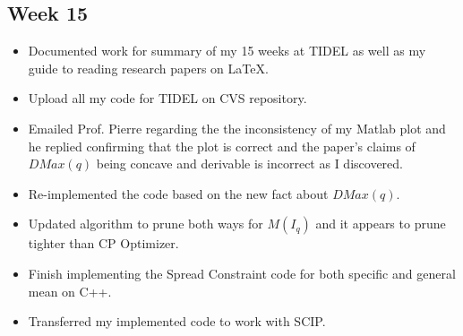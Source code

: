 \documentclass[a4paper,12pt]{article}
\begin{document}
\subsection{Week 15}
	\begin{itemize}
		\item Documented work for summary of my 15 weeks at TIDEL as well as my guide to reading research papers on \LaTeX. 
		\item Upload all my code for TIDEL on CVS repository.
		\item Emailed Prof. Pierre regarding the the inconsistency of my Matlab plot and he replied confirming that the plot is correct and the paper's claims of $DMax(q)$ being concave and derivable is incorrect as I discovered. 
		\item Re-implemented the code based on the new fact about $DMax(q)$.  
		\item Updated algorithm to prune both ways for $M(I_{q})$ and it appears to prune tighter than CP Optimizer. 
		\item Finish implementing the Spread Constraint code for both 
			specific and general mean on C++.
		\item Transferred my implemented code to work with SCIP. 
	\end{itemize}

	 
\end{document}
